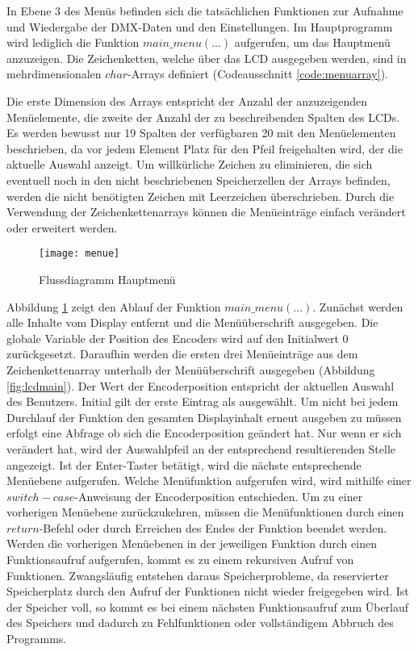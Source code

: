 In Ebene 3 des Menüs befinden sich die tatsächlichen Funktionen zur Aufnahme und Wiedergabe der DMX-Daten und den Einstellungen. Im Hauptprogramm wird lediglich die Funktion $main\_menu(...)$ aufgerufen, um das Hauptmenü anzuzeigen. Die Zeichenketten, welche über das LCD ausgegeben werden, sind in mehrdimensionalen $char$-Arrays definiert (Codeausschnitt \ref{code:menuarray}).

Die erste Dimension des Arrays entspricht der Anzahl der anzuzeigenden Menüelemente, die zweite der Anzahl der zu beschreibenden Spalten des LCDs. Es werden bewusst nur 19 Spalten der verfügbaren 20 mit den Menüelementen beschrieben, da vor jedem Element Platz für den Pfeil freigehalten wird, der die aktuelle Auswahl anzeigt. Um willkürliche Zeichen zu eliminieren, die sich eventuell noch in den nicht beschriebenen Speicherzellen der Arrays befinden, werden die nicht benötigten Zeichen mit Leerzeichen überschrieben. Durch die Verwendung der Zeichenkettenarrays können die Menüeinträge einfach verändert oder erweitert werden. 
\begin{figure}[h!]
	\centering
	\texttt{[image: menue]}
	\caption{Flussdiagramm Hauptmenü}
	\label{fig:flusshauptmenu}
\end{figure}
Abbildung \ref{fig:flusshauptmenu} zeigt den Ablauf der Funktion $main\_menu(...)$. Zunächst werden alle Inhalte vom Display entfernt und die Menüüberschrift ausgegeben. Die globale Variable der Position des Encoders wird auf den Initialwert 0 zurückgesetzt. Daraufhin werden die ersten drei Menüeinträge aus dem Zeichenkettenarray unterhalb der Menüüberschrift ausgegeben (Abbildung \ref{fig:lcdmain}). Der Wert der Encoderposition entspricht der aktuellen Auswahl des Benutzers. Initial gilt der erste Eintrag als ausgewählt. Um nicht bei jedem Durchlauf der Funktion den gesamten Displayinhalt erneut ausgeben zu müssen erfolgt eine Abfrage ob sich die Encoderposition geändert hat. Nur wenn er sich verändert hat, wird der Auswahlpfeil an der entsprechend resultierenden Stelle angezeigt. Ist der Enter-Taster betätigt, wird die nächste entsprechende Menüebene aufgerufen. Welche Menüfunktion aufgerufen wird, wird mithilfe einer $switch-case$-Anweisung der Encoderposition entschieden. 
\newline
Um zu einer vorherigen Menüebene zurückzukehren, müssen die Menüfunktionen durch einen $return$-Befehl oder durch Erreichen des Endes der Funktion beendet werden. Werden die vorherigen Menüebenen in der jeweiligen Funktion durch einen Funktionsaufruf aufgerufen, kommt es zu einem rekursiven Aufruf von Funktionen. Zwangsläufig entstehen daraus Speicherprobleme, da reservierter Speicherplatz durch den Aufruf der Funktionen nicht wieder freigegeben wird. Ist der Speicher voll, so kommt es bei einem nächsten Funktionsaufruf zum Überlauf des Speichers und dadurch zu Fehlfunktionen oder vollständigem Abbruch des Programms.